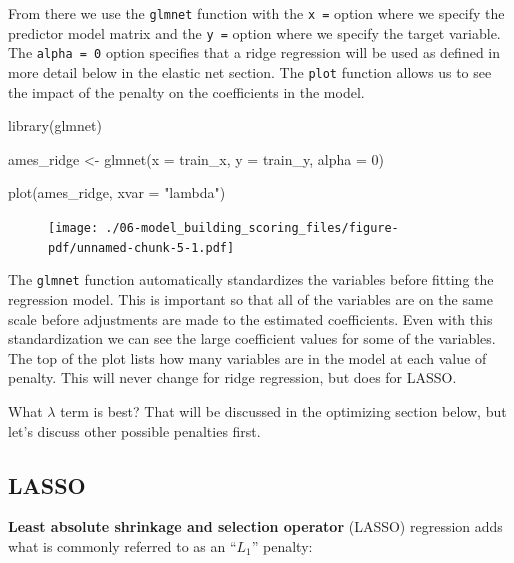 \documentclass[
  letterpaper,
  DIV=11,
  numbers=noendperiod]{scrreprt}
\newenvironment{Shaded}{\begin{snugshade}}{\end{snugshade}}
\newcommand{\AttributeTok}[1]{\textcolor[rgb]{0.40,0.45,0.13}{#1}}
\newcommand{\DecValTok}[1]{\textcolor[rgb]{0.68,0.00,0.00}{#1}}
\newcommand{\FunctionTok}[1]{\textcolor[rgb]{0.28,0.35,0.67}{#1}}
\newcommand{\NormalTok}[1]{\textcolor[rgb]{0.00,0.23,0.31}{#1}}
\newcommand{\OtherTok}[1]{\textcolor[rgb]{0.00,0.23,0.31}{#1}}
\newcommand{\StringTok}[1]{\textcolor[rgb]{0.13,0.47,0.30}{#1}}
\begin{document}
From there we use the \texttt{glmnet} function with the \texttt{x\ =}
option where we specify the predictor model matrix and the \texttt{y\ =}
option where we specify the target variable. The \texttt{alpha\ =\ 0}
option specifies that a ridge regression will be used as defined in more
detail below in the elastic net section. The \texttt{plot} function
allows us to see the impact of the penalty on the coefficients in the
model.

\begin{Shaded}
\begin{Highlighting}[]
\FunctionTok{library}\NormalTok{(glmnet)}

\NormalTok{ames\_ridge }\OtherTok{\textless{}{-}} \FunctionTok{glmnet}\NormalTok{(}\AttributeTok{x =}\NormalTok{ train\_x,  }\AttributeTok{y =}\NormalTok{ train\_y,  }\AttributeTok{alpha =} \DecValTok{0}\NormalTok{)}

\FunctionTok{plot}\NormalTok{(ames\_ridge, }\AttributeTok{xvar =} \StringTok{"lambda"}\NormalTok{)}
\end{Highlighting}
\end{Shaded}

\begin{figure}[H]

{\centering \texttt{[image: ./06-model\_building\_scoring\_files/figure-pdf/unnamed-chunk-5-1.pdf]}

}

\end{figure}

The \texttt{glmnet} function automatically standardizes the variables
before fitting the regression model. This is important so that all of
the variables are on the same scale before adjustments are made to the
estimated coefficients. Even with this standardization we can see the
large coefficient values for some of the variables. The top of the plot
lists how many variables are in the model at each value of penalty. This
will never change for ridge regression, but does for LASSO.

What \(\lambda\) term is best? That will be discussed in the optimizing
section below, but let's discuss other possible penalties first.

\hypertarget{lasso}{%
\subsection{LASSO}\label{lasso}}

\textbf{Least absolute shrinkage and selection operator} (LASSO)
regression adds what is commonly referred to as an ``\(L_1\)'' penalty:
\end{document}
